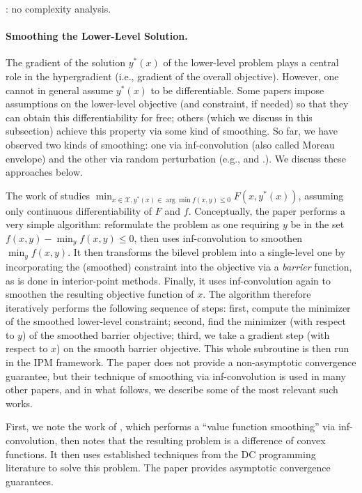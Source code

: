 \cite{landry2019differentiable}: no complexity analysis. 


\paragraph{Smoothing the Lower-Level Solution.}
The gradient of the solution $y^\ast(x)$ of the lower-level problem plays a central role in the hypergradient (i.e., gradient of the overall objective). However, one cannot in general assume $y^\ast(x)$ to be differentiable. Some papers impose assumptions on the lower-level objective (and constraint, if needed) so that they can obtain this differentiability for free; others (which we discuss in this subsection) achieve this property via some kind of smoothing. So far, we have observed two kinds of smoothing: one via inf-convolution (also called Moreau envelope) and the other via random perturbation (e.g., \cite{khanduri2023linearly} and \cite{DMLCBO}.). We discuss these approaches below. 

The work of \cite{liu2021value} studies $\min_{x\in \mathcal{X}, y^\ast(x)\in \arg\min f(x,y)\leq 0} F(x, y^\ast(x))$, assuming only continuous differentiability of $F$ and $f$. Conceptually, the paper performs a very simple algorithm: reformulate the problem as one requiring $y$ be in the set $f(x, y) - \min_y f(x, y)\leq 0$, then uses inf-convolution to smoothen $\min_y f(x, y)$. It then transforms the bilevel problem into a single-level one by incorporating the (smoothed) constraint into the objective via a \emph{barrier} function, as is done in interior-point methods. Finally, it uses inf-convolution again to smoothen the resulting objective function of $x$. The algorithm therefore iteratively performs the following sequence of steps: first, compute the minimizer of the smoothed lower-level constraint; second, find the minimizer (with respect to $y$) of the smoothed barrier objective; third, we take a gradient step (with respect to $x$) on the smooth barrier objective. This whole subroutine is then run in the IPM framework. The paper does not provide a non-asymptotic convergence guarantee, but their technique of smoothing via inf-convolution is used in many other papers, and in what follows, we describe some of the most relevant such works. 

First, we note the work of \cite{ye2023difference}, which performs a ``value function smoothing'' via inf-convolution, then notes that the resulting problem is a difference of convex functions. It then uses established techniques from the DC programming literature to solve this problem. The paper provides asymptotic convergence guarantees. 


